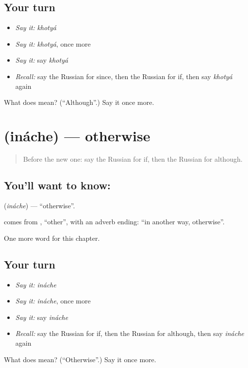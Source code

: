 \subsection*{Your turn}
\begin{itemize}
\raggedright
  \item \emph{Say it:} \emph{khotyá}
  \item \emph{Say it:} \emph{khotyá}, once more
  \item \emph{Say it:} say \emph{khotyá}
  \item \emph{Recall:} say the Russian for since, then the Russian for if, then say \emph{khotyá} again
\end{itemize}

\begin{tcolorbox}[breakable,colback=teal!4,colframe=teal!35!black,title={Before you move on}]
What does  mean? (\textquotedblleft{}Although\textquotedblright{}.) Say it once more.
\end{tcolorbox}
\section[\texorpdfstring{\ru{иначе} (ináche)}{иначе (ináche)}]{ (ináche) — otherwise}

\label{lesson:RU-C154-inache}



\begin{quote}
Before the new one: say the Russian for if, then the Russian for although.
\end{quote}

\subsection*{You'll want to know: }
\textbf{} (\emph{ináche}) — \textquotedblleft{}otherwise\textquotedblright{}.

\begin{cousinweb}
\textbf{} comes from \emph{}, \textquotedblleft{}other\textquotedblright{}, with an adverb ending: \textquotedblleft{}in another way, otherwise\textquotedblright{}.
\end{cousinweb}

\begin{grammarlens}[title={What you've built}]
One more word for this chapter.
\end{grammarlens}

\subsection*{Your turn}
\begin{itemize}
\raggedright
  \item \emph{Say it:} \emph{ináche}
  \item \emph{Say it:} \emph{ináche}, once more
  \item \emph{Say it:} say \emph{ináche}
  \item \emph{Recall:} say the Russian for if, then the Russian for although, then say \emph{ináche} again
\end{itemize}

\begin{tcolorbox}[breakable,colback=teal!4,colframe=teal!35!black,title={Before you move on}]
What does  mean? (\textquotedblleft{}Otherwise\textquotedblright{}.) Say it once more.
\end{tcolorbox}
